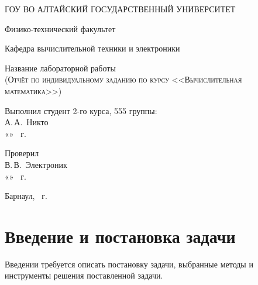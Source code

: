 \documentclass[a4paper,14pt]{extarticle}
\begin{document}
\begin{titlepage}
  \begin{center}
    ГОУ ВО АЛТАЙСКИЙ ГОСУДАРСТВЕННЫЙ УНИВЕРСИТЕТ
    \vspace{0.25cm}
    
    Физико-технический факультет
    
    Кафедра вычислительной техники и электроники
    \vfill
    
    {\LARGE Название лабораторной работы}\\[5mm]
    \textsc{(Отчёт по индивидуальному заданию по курсу <<Вычислительная математика>>)}
  \bigskip

\end{center}
\vfill

\newlength{\ML}
\hfill\begin{minipage}{0.4\textwidth}
  Выполнил студент 2-го курса, 555 группы:\\
  \underline{\hspace{\ML}} А.\,А.~Никто\\
  «\underline{\hspace{0.7cm}}» \underline{\hspace{2cm}} \the\year~г.
\end{minipage}%
\bigskip

\hfill\begin{minipage}{0.4\textwidth}
  Проверил\\
  \underline{\hspace{\ML}} В.\,В.~Электроник\\
  «\underline{\hspace{0.7cm}}» \underline{\hspace{2cm}} \the\year~г.
\end{minipage}%
\vfill

\begin{center}
  Барнаул, \the\year~г.
\end{center}
\end{titlepage}


\tableofcontents

\section{Введение и постановка задачи}
Введении требуется описать постановку задачи, выбранные методы и инструменты решения
поставленной задачи.
\end{document}
